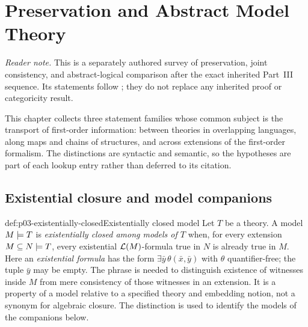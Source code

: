 
\chapter{Preservation and Abstract Model Theory}
\label{sec:p03-preservation-abstract}

\noindent\textit{Reader note.}  This is a separately authored survey of
preservation, joint consistency, and abstract-logical comparison after the
exact inherited Part~III sequence.  Its statements follow
\cite{ChangKeisler1990,Lindstrom1969}; they do not replace any inherited proof
or categoricity result.

This chapter collects three statement families whose common subject is the
transport of first-order information: between theories in overlapping
languages, along maps and chains of structures, and across extensions of the
first-order formalism.  The distinctions are syntactic and semantic, so the
hypotheses are part of each lookup entry rather than deferred to its citation.

\section{Existential closure and model companions}
\label{sec:p03-model-companions}

\begin{hbdefinition}{def:p03-existentially-closed}{Existentially closed model}
Let \(T\) be a theory.  A model \(M\models T\) is
\emph{existentially closed among models of \(T\)} when, for every extension
\(M\subseteq N\models T\), every existential \(\mathcal{L}(M)\)-formula true in
\(N\) is already true in \(M\).  Here an \emph{existential formula} has the
form \(\exists\bar y\,\theta(\bar x,\bar y)\) with \(\theta\)
quantifier-free; the tuple \(\bar y\) may be empty.  The phrase is needed to distinguish
existence of witnesses inside \(M\) from mere consistency of those witnesses
in an extension.  It is a property of a model relative to a specified theory
and embedding notion, not a synonym for algebraic closure.  The distinction
is used to identify the models of the companions below.
\end{hbdefinition}

